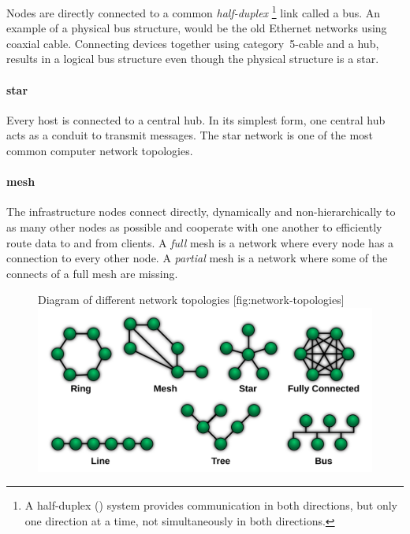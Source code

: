 Nodes are directly connected to a common \emph{half-duplex}%
\footnote{A half-duplex () system provides communication in both directions, but only one direction at a time, not simultaneously in both directions.}
link called a bus.
An example of a physical bus structure, would be the old Ethernet networks using coaxial cable.
Connecting devices together using category~5-cable and a hub, results in a logical bus structure even though the physical structure is a star.

\paragraph{star}
Every host is connected to a central hub.
In its simplest form, one central hub acts as a conduit to transmit messages.
The star network is one of the most common computer network topologies.


\paragraph{mesh}
The infrastructure nodes connect directly, dynamically and non-hi\-er\-ar\-chi\-cal\-ly to as many other nodes as possible and cooperate with one another to efficiently route data to and from clients.
A \emph{full} mesh is a network where every node has a connection to every other node.
A \emph{partial} mesh is a network where some of the connects of a full mesh are missing.


\begin{figure}
\begin{sidecaption}%
   {Diagram of different network topologies}%
   [fig:network-topologies]
\centering
\includegraphics[width=\textwidth]{images/introduction/network-topologies.png}
\end{sidecaption}
\end{figure}



